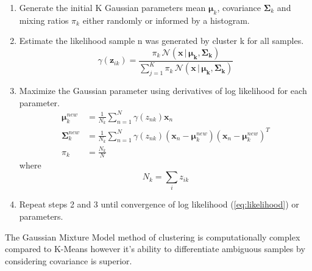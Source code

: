 \begin{enumerate}
	\item Generate the initial K Gaussian parameters mean $\bm{\mu}_{k}$, covariance $\bm{\Sigma}_k$ and mixing ratios $\pi_k$ either randomly or informed by a histogram.
	\item Estimate the likelihood sample n was generated by cluster k for all samples. 
	\begin{equation}
		\gamma(\bm{z}_{ik})=\frac{\pi_k\, \mathcal{N}(\bm{x}\,|\,\bm{\mu_k},\bm{\Sigma_k})}{\sum_{j=1}^{K}\pi_k\, \mathcal{N}(\bm{x}\,|\,\bm{\mu_k},\bm{\Sigma_k})}
	\end{equation}

	\item Maximize the Gaussian parameter using derivatives of log likelihood for each parameter.
	\begin{align}	
	\label{eq:mean}
	\bm{\mu}_{k}^{new} &= \frac{1}{N_k}\sum_{n=1}^N \gamma(z_{nk} ) \bm{x}_n \\
	\label{eq:covariance}
	\bm{\Sigma}_k^{new} &=  \frac{1}{N_k}\sum_{n=1}^N\gamma(z_{nk})(\bm{x}_n- \bm{\mu}_k^{new})(\bm{x}_n - \bm{\mu}_k^{new})^T \\
	\label{eq:ratio}
	\pi_k &= \frac{N_k}{N}
	\end{align}
	where \newline
	\[N_k = \sum_{i} z_{ik}\]
	\item Repeat steps 2 and 3 until convergence of log likelihood (\ref{eq:likelihood}) or parameters. 
\end{enumerate}

The Gaussian Mixture Model method of clustering is computationally complex compared to K-Means however it's ability to differentiate ambiguous samples by considering covariance is superior. 